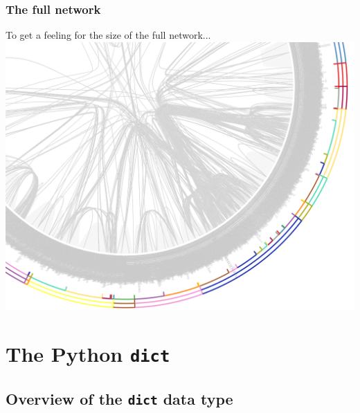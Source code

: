 \documentclass[xcolor=dvipsnames, 9pt]{beamer}
\begin{document}
\begin{frame}[fragile]
    \frametitle{The full network}
    To get a feeling for the size of the full network...
    \includegraphics[scale=0.3]{../images/networks/big_wheel.png}
\end{frame}



\section{The Python \texttt{dict}} %
\label{sec:the_python_dict}

\subsection{Overview of the \texttt{dict} data type} %
\label{sub:overview_of_the_dict}
\end{document}
